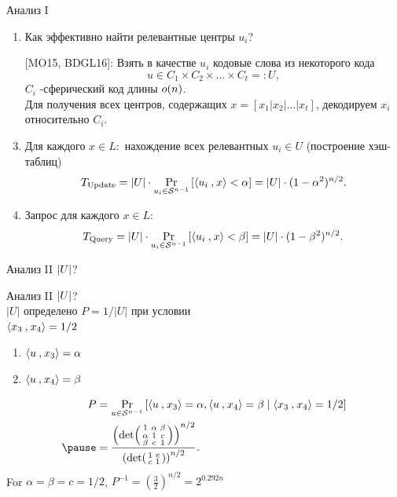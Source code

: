 \documentclass[usenames,dvipsnames, 9pt]{beamer}
\begin{document}
\begin{frame}{Анализ I}
\LARGE
\begin{enumerate}
	\item Как эффективно найти релевантные центры $u_i$?
	\item[][MO15, BDGL16]: Взять в качестве $u_i$ кодовые слова из некоторого кода
	\[
	u \in C_1 \times C_2 \times \ldots \times C_t =:U,
	\]
	$C_i$ -сферический код длины $o(n)$.\\[10pt]
	
	Для получения всех центров, содержащих $x = [x_1 | x_2 | \ldots | x_t]$, декодируем $x_i$ относительно $C_i$. \\[10pt] 
	\pause
	\item Для каждого $x \in L:$ нахождение всех релевантных $u_i \in U$ (построение хэш-таблиц)
	\[
	T_{\text{Update}} = |U| \cdot \Pr_{u_i \in \mathcal{S}^{n-1}}\left[ \langle u_i\mathbin{,}x\rangle < \alpha \right] = |U|\cdot(1-\alpha^2)^{n/2}.
	\]
	\pause
	\item Запрос для каждого $x \in L$: 
	\[
	T_{\text{Query}} = |U| \cdot \Pr_{u_i \in \mathcal{S}^{n-1}}\left[ \langle u_i\mathbin{,}x\rangle < \beta \right] = |U|\cdot(1-\beta^2)^{n/2}.
	\]
	
\end{enumerate}
\end{frame}

\begin{frame}{Анализ II}
\Large
\centering
$\left\lvert U\right\rvert$?\\

\end{frame}

\begin{frame}{Анализ II}
\Large
\centering
 $\left\lvert U\right\rvert$?\\[10pt]

$|U|$ определено $P = 1/|U|$ при условии \\ $\langle x_3\mathbin{,}x_4\rangle  = 1/2$
\begin{enumerate}
\item $\langle u\mathbin{,}x_3\rangle  = \alpha$
\item $\langle u\mathbin{,}x_4\rangle  = \beta$
\end{enumerate}
\begin{align*}
P &= \Pr_{u \in \mathcal{S}^{n-1}} \left[  \ScProd{u}{x_3}  = \alpha, \ScProd{u}{x_4}  = \beta \; |  \; \ScProd{x_3}{x_4}  = 1/2\right]  \\ \pause
&= \frac{
\left(\det\begin{psmallmatrix}
1 & \alpha & \beta \\
\alpha & 1 & c\\
\beta & c & 1
\end{psmallmatrix}
\right)^{n/2}
}
{
\left(\det\begin{psmallmatrix}
1 & c \\
c & 1
\end{psmallmatrix}\right)^{n/2}
}.
\end{align*}
\pause
For $\alpha=\beta = c = 1/2$, $P^{-1} = \left(\frac{3}{2}\right)^{n/2} = 2^{0.292n}$ 


\end{frame}
\end{document}
